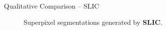 \documentclass[handout]{beamer}
\begin{document}
	\begin{frame}{Qualitative Comparison -- SLIC}
		\begin{figure}
   			\centering
   			\caption{Superpixel segmentations generated by \textbf{SLIC}.}
   		\end{figure}
	\end{frame}
	
\end{document}
